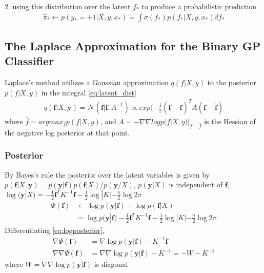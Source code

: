 \documentclass[a4paper]{article}
\begin{document}
2. using this distribution over the latent $f_*$ to produce a probabilistic prediction
\begin{align}
  \hat{\pi}_* \gets p(y_*=+1|X,y,x_*) = \int \sigma(f_*)p(f_*|X,y,x_*) df_*
\end{align}


\subsection{The Laplace Approximation for the Binary GP Classifier}
Laplace’s method utilizes a Gaussian approximation $q(f|X, y)$ to the posterior $p(f|X, y)$ in the integral \ref{eq:latent_dist}
\begin{align}
\label{eq:gaussian_appro}
  q(\mathbf{f}|X,\mathbf{y}) = \mathcal{N}(\mathbf{f}|\mathbf{\hat{f}}, A^{-1}) \propto exp(-\frac{1}{2} (\mathbf{f} - \mathbf{\hat{f}})^T A (\mathbf{f} - \mathbf{\hat{f}})
\end{align}
where $\hat{f} = argmax_f p(f|X, y)$, and $A = -\nabla\nabla log p(f|X, y)|_{f=\hat{f}}$ is the Hessian of the negative log posterior at that point.

\subsubsection{Posterior}
\label{sec:3.4.1}

By Bayes's rule the posterior over the latent variables is given by $p(\mathbf{f}|X,\mathbf{y}) = p(\mathbf{y}|\mathbf{f})p(\mathbf{f}|X)/p(\mathbf{y}/X)$, $p(\mathbf{y}|X)$ is independent of $\mathbf{f}$, $\log(\mathbf{y}|X) = -\frac{1}{2} \mathbf{f}^T K^{-1} \mathbf{f} - \frac{1}{2} \log |K| - \frac{n}{2} \log 2\pi$
\begin{align*}
\label{eq:logposterior}
  \Psi(\mathbf{f}) &\gets \log p(\mathbf{y}|\mathbf{f}) + \log p(\mathbf{f}|X) \\
  &= \log p(\mathbf{y}|\mathbf{f}) -\frac{1}{2} \mathbf{f}^T K^{-1} \mathbf{f} - \frac{1}{2} \log |K| - \frac{n}{2} \log 2\pi
\end{align*}
Differentiating \ref{eq:logposterior},
\begin{align*}
  \nabla \Psi(\mathbf{f}) &= \nabla \log p(\mathbf{y}|\mathbf{f}) - K^{-1}\mathbf{f}\\
  \nabla\nabla \Psi(\mathbf{f}) &= \nabla\nabla \log p(\mathbf{y}|\mathbf{f}) - K^{-1} = -W - K^{-1}
\end{align*}
where $W = \nabla\nabla \log p(\mathbf{y}|\mathbf{f})$ is diagonal
\end{document}

